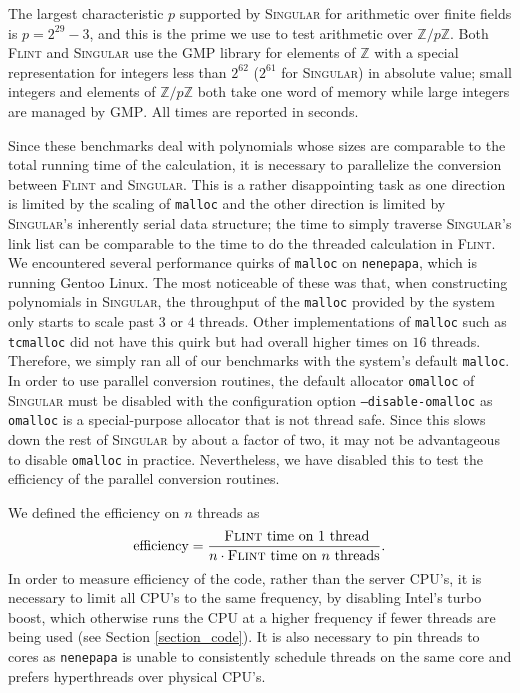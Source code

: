 \documentclass{deliverablereport}
\begin{document}
The largest characteristic $p$ supported by \textsc{Singular} for arithmetic over finite fields is $p = 2^{29}-3$, and this is the prime we use to test arithmetic over $\mathbb{Z}/p \mathbb{Z}$. Both \textsc{Flint} and \textsc{Singular} use the \textsc{GMP} library for elements of $\mathbb{Z}$ with a special representation for integers less than $2^{62}$ ($2^{61}$ for \textsc{Singular}) in absolute value; small integers and elements of $\mathbb{Z}/p \mathbb{Z}$ both take one word of memory while large integers are managed by \textsc{GMP}. All times are reported in seconds.

Since these benchmarks deal with polynomials whose sizes are comparable to the total running time of the calculation, it is necessary to parallelize the conversion between \textsc{Flint} and \textsc{Singular}. This is a rather disappointing task as one direction is limited by the scaling of {\tt malloc} and the other direction is limited by \textsc{Singular}'s inherently serial data structure; the time to simply traverse \textsc{Singular}'s link list can be comparable to the time to do the threaded calculation in \textsc{Flint}. We encountered several performance quirks of {\tt malloc} on {\tt nenepapa}, which is running Gentoo Linux. The most noticeable of these was that, when constructing polynomials in \textsc{Singular}, the throughput of the {\tt malloc} provided by the system only starts to scale past $3$ or $4$ threads. Other implementations of {\tt malloc} such as {\tt tcmalloc} did not have this quirk but had overall higher times on $16$ threads. Therefore, we simply ran all of our benchmarks with the system's default {\tt malloc}. In order to use parallel conversion routines, the default allocator {\tt omalloc} of \textsc{Singular} must be disabled with the configuration option {\tt --disable-omalloc} as {\tt omalloc} is a special-purpose allocator that is not thread safe. Since this slows down the rest of \textsc{Singular} by about a factor of two, it may not be advantageous to disable {\tt omalloc} in practice. Nevertheless, we have disabled this to test the efficiency of the parallel conversion routines. 

We defined the efficiency on $n$ threads as
\begin{equation*}
\text{efficiency} = \frac{\text{ \textsc{Flint} time on $1$ thread}}{n \cdot \text{\textsc{Flint} time on $n$ threads}}\text{.}
\end{equation*}
In order to measure efficiency of the code, rather than the server CPU's, it is necessary to limit all CPU's to the same frequency, by disabling Intel's turbo boost, which otherwise runs the CPU at a higher frequency if fewer threads are being used (see Section \ref{section_code}). It is also necessary to pin threads to cores as {\tt nenepapa} is unable to consistently schedule threads on the same core and prefers hyperthreads over physical CPU's.
\end{document}
